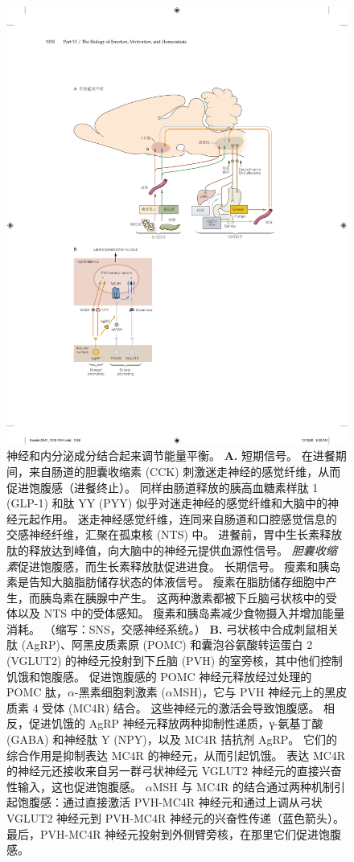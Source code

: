 \begin{figure}[htbp]
	\centering
	\includegraphics[width=0.8\linewidth]{chap41/fig_41_14}
	\caption{神经和内分泌成分结合起来调节能量平衡。 
		\textbf{A.} 短期信号。
		在进餐期间，来自肠道的胆囊收缩素 (CCK) 刺激迷走神经的感觉纤维，从而促进饱腹感（进餐终止）。
		同样由肠道释放的胰高血糖素样肽 1 (GLP-1) 和肽 YY (PYY) 似乎对迷走神经的感觉纤维和大脑中的神经元起作用。
		迷走神经感觉纤维，连同来自肠道和口腔感觉信息的交感神经纤维，汇聚在孤束核 (NTS) 中。
		进餐前，胃中生长素释放肽的释放达到峰值，向大脑中的神经元提供血源性信号。
		\textit{胆囊收缩素}促进饱腹感，而生长素释放肽促进进食。
		长期信号。
		瘦素和胰岛素是告知大脑脂肪储存状态的体液信号。
		瘦素在脂肪储存细胞中产生，而胰岛素在胰腺中产生。
		这两种激素都被下丘脑弓状核中的受体以及 NTS 中的受体感知。
		瘦素和胰岛素减少食物摄入并增加能量消耗。
		（缩写：SNS，交感神经系统。）
		\textbf{B.} 弓状核中合成刺鼠相关肽 (AgRP)、阿黑皮质素原 (POMC) 和囊泡谷氨酸转运蛋白 2 (VGLUT2) 的神经元投射到下丘脑 (PVH) 的室旁核，其中他们控制饥饿和饱腹感。
		促进饱腹感的 POMC 神经元释放经过处理的 POMC 肽，$\alpha$-黑素细胞刺激素 ($\alpha$MSH)，它与 PVH 神经元上的黑皮质素 4 受体 (MC4R) 结合。
		这些神经元的激活会导致饱腹感。
		相反，促进饥饿的 AgRP 神经元释放两种抑制性递质，γ-氨基丁酸 (GABA) 和神经肽 Y (NPY)，以及 MC4R 拮抗剂 AgRP。
		它们的综合作用是抑制表达 MC4R 的神经元，从而引起饥饿。
		表达 MC4R 的神经元还接收来自另一群弓状神经元 VGLUT2 神经元的直接兴奋性输入，这也促进饱腹感。
		$\alpha$MSH 与 MC4R 的结合通过两种机制引起饱腹感：通过直接激活 PVH-MC4R 神经元和通过上调从弓状 VGLUT2 神经元到 PVH-MC4R 神经元的兴奋性传递（蓝色箭头）。
		最后，PVH-MC4R 神经元投射到外侧臂旁核，在那里它们促进饱腹感。}
	\label{fig:41_14}
\end{figure}


